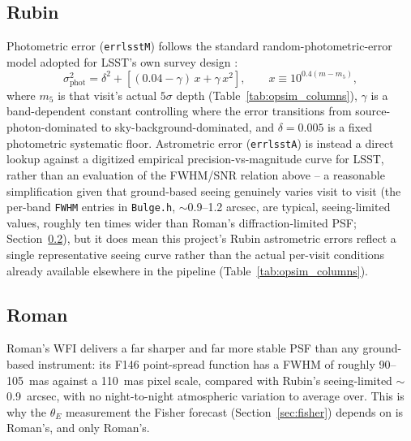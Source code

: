 \documentclass[english,10pt,a4paper]{article}
\begin{document}
	\subsection{Rubin}
	\label{subsec:rubin_errors}
	
	Photometric error (\texttt{errlsstM}) follows the standard random-photometric-error model adopted for LSST's own survey design \cite{Ivezic2019LSST}:
	\[
	\sigma_{\mathrm{phot}}^2 = \delta^2 + \left[(0.04-\gamma)\,x + \gamma\,x^2\right], \qquad x \equiv 10^{0.4(m-m_5)},
	\]
	where $m_5$ is that visit's actual $5\sigma$ depth (Table~\ref{tab:opsim_columns}), $\gamma$ is a band-dependent constant controlling where the error transitions from source-photon-dominated to sky-background-dominated, and $\delta=0.005$ is a fixed photometric systematic floor. Astrometric error (\texttt{errlsstA}) is instead a direct lookup against a digitized empirical precision-vs-magnitude curve for LSST, rather than an evaluation of the FWHM/SNR relation above -- a reasonable simplification given that ground-based seeing genuinely varies visit to visit (the per-band \texttt{FWHM} entries in \texttt{Bulge.h}, $\sim$0.9--1.2 arcsec, are typical, seeing-limited values, roughly ten times wider than Roman's diffraction-limited PSF; Section~\ref{subsec:roman_errors}), but it does mean this project's Rubin astrometric errors reflect a single representative seeing curve rather than the actual per-visit conditions already available elsewhere in the pipeline (Table~\ref{tab:opsim_columns}).
	
	\subsection{Roman}
	\label{subsec:roman_errors}
	
	Roman's WFI delivers a far sharper and far more stable PSF than any ground-based instrument: its F146 point-spread function has a FWHM of roughly 90--105~mas \cite{Fardeen2024PBH,ROTAC2025} against a 110~mas pixel scale, compared with Rubin's seeing-limited $\sim$0.9~arcsec, with no night-to-night atmospheric variation to average over. This is why the $\theta_E$ measurement the Fisher forecast (Section~\ref{sec:fisher}) depends on is Roman's, and only Roman's.
	
\end{document}
